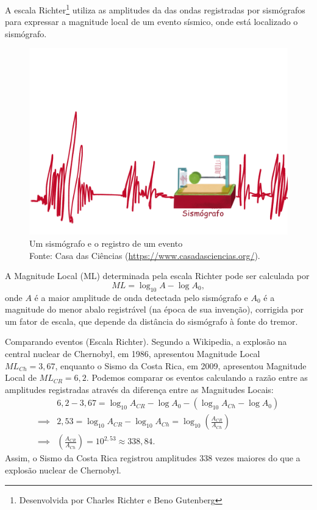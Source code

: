 A escala Richter\footnote{Desenvolvida por Charles Richter e Beno Gutenberg} utiliza as amplitudes da das ondas registradas por sismógrafos para expressar a magnitude local de um evento sísmico, onde está localizado o sismógrafo.
\begin{figure}[!h]
\centering

\includegraphics[width=0.8\linewidth]{Sismografo.png}

\caption{Um sismógrafo e o registro de um evento \\ Fonte: Casa das Ciências (\url{https://www.casadasciencias.org/}).}

\end{figure}

A Magnitude Local (ML) determinada pela escala Richter pode ser calculada por
$$
ML = \log_{10} A - \log A_0,
$$
onde $A$ é a maior amplitude de onda detectada pelo sismógrafo e $A_0$ é a magnitude do menor abalo registrável (na época de sua invenção), corrigida por um fator de escala, que depende da distância do sismógrafo à fonte do tremor.


\begin{example}{Comparando eventos (Escala Richter).}
Segundo a Wikipedia, a explosão na central nuclear de Chernobyl, em 1986, apresentou Magnitude Local $ML_{Ch} = 3{,}67$, enquanto o Sismo da Costa Rica, em 2009, apresentou Magnitude Local de $ML_{CR}=6{,}2$. Podemos comparar os eventos calculando a razão entre as amplitudes registradas através da diferença entre as Magnitudes Locais:
\begin{align*}
&6{,}2-3{,}67 = \log_{10} A_{CR} - \log A_0 - (\log_{10} A_{Ch} - \log A_0)\\
\implies & 2{,}53 = \log_{10} A_{CR} - \log_{10} A_{Ch} = \log_{10} \left(\frac{A_{CR}}{A_{Ch}}\right)\\
\implies & \left(\frac{A_{CR}}{A_{Ch}}\right) = 10^{2{,}53} \approx 338{,}84.
\end{align*} 
Assim, o Sismo da Costa Rica registrou amplitudes 338 vezes maiores do que a explosão nuclear de Chernobyl.
\end{example}

